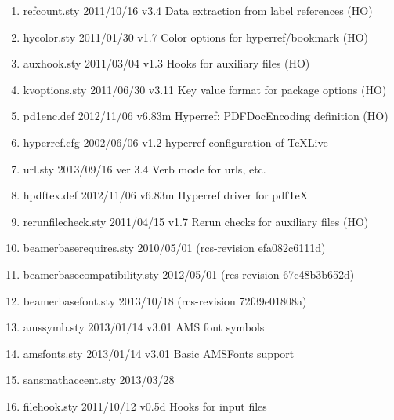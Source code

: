 \begin{enumerate}
\item refcount.sty 2011/10/16 v3.4 Data extraction from label references (HO)
\item 		 hycolor.sty 2011/01/30 v1.7 Color options for hyperref/bookmark (HO)
\item 		 auxhook.sty 2011/03/04 v1.3 Hooks for auxiliary files (HO)
\item 		 kvoptions.sty 2011/06/30 v3.11 Key value format for package options (HO)
\item 		 pd1enc.def 2012/11/06 v6.83m Hyperref: PDFDocEncoding definition (HO)
\item 		 hyperref.cfg 2002/06/06 v1.2 hyperref configuration of TeXLive
\item 		 url.sty 2013/09/16 ver 3.4 Verb mode for urls, etc.
\item 		 hpdftex.def 2012/11/06 v6.83m Hyperref driver for pdfTeX
\item 		 rerunfilecheck.sty 2011/04/15 v1.7 Rerun checks for auxiliary files (HO)
\item 		 beamerbaserequires.sty 2010/05/01 (rcs-revision efa082c6111d)
\item 		 beamerbasecompatibility.sty 2012/05/01 (rcs-revision 67c48b3b652d)
\item 		 beamerbasefont.sty 2013/10/18 (rcs-revision 72f39e01808a)
\item 		 amssymb.sty 2013/01/14 v3.01 AMS font symbols
\item 		 amsfonts.sty 2013/01/14 v3.01 Basic AMSFonts support
\item 		 sansmathaccent.sty 2013/03/28
\item 		 filehook.sty 2011/10/12 v0.5d Hooks for input files

\end{enumerate}
